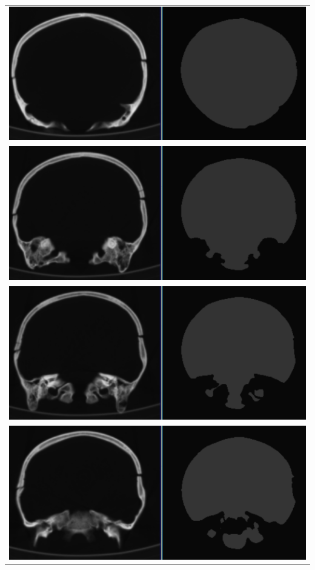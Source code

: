 \begin{table}[ht]
    \centering
    \begin{tabular}{c}
    \includegraphics[scale=.5]{data/png/15}\\
    \newline
    \includegraphics[scale=.5]{data/png/17}\\
    \newline
    \includegraphics[scale=.5]{data/png/18}\\
    \newline
    \includegraphics[scale=.5]{data/png/19}\\
    \end{tabular}
    \label{tab:gt2}
\end{table}%

